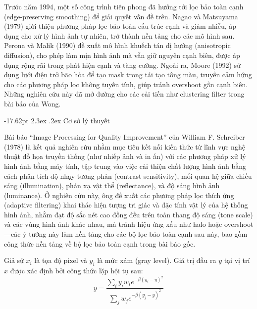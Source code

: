 \documentclass[a4paper]{report}
\makeatletter
\renewcommand\section{\@startsection{section}{1}{\z@}%
    {-17.62pt \@plus -5.89pt \@minus -1.18pt}%
    {2.3ex \@plus .2ex}%
    {\normalfont\fontsize{14.95pt}{16.31pt}\selectfont\bfseries}}%
\makeatother
\begin{document}
Trước năm 1994, một số công trình tiên phong đã hướng tới lọc bảo toàn cạnh
(edge-preserving smoothing) để giải quyết vấn đề trên. Nagao và Matsuyama\cite{nagao1979}
(1979) giới thiệu phương pháp lọc bảo toàn cấu trúc cạnh và giảm nhiễu, áp dụng
cho xử lý hình ảnh tự nhiên, trở thành nền tảng cho các mô hình sau. Perona và
Malik\cite{perona1990} (1990) đề xuất mô hình khuếch tán dị hướng (anisotropic diffusion), cho
phép làm mịn hình ảnh mà vẫn giữ nguyên cạnh biên, được áp dụng rộng rãi trong
phát hiện cạnh và tăng cường. Ngoài ra, Moore\cite{moore1992} (1992) sử dụng lưới điện trở bão
hòa để tạo mask trong tái tạo tông màu, truyền cảm hứng cho các phương pháp
lọc không tuyến tính, giúp tránh overshoot gần cạnh biên. Những nghiên cứu này
đã mở đường cho các cải tiến như clustering filter trong bài báo của Wong.

\section{Cơ sở lý thuyết}

Bài báo ``Image Processing for Quality Improvement''\cite{schreiber1978} của William F. Schreiber
(1978) là kết quả nghiên cứu nhằm mục tiêu kết nối kiến thức từ lĩnh vực nghệ
thuật đồ họa truyền thống (như nhiếp ảnh và in ấn) với các phương pháp xử lý hình
ảnh bằng máy tính, tập trung vào việc cải thiện chất lượng hình ảnh bằng cách
phân tích độ nhạy tương phản (contrast sensitivity), mối quan hệ giữa chiếu sáng
(illumination), phản xạ vật thể (reflectance), và độ sáng hình ảnh (luminance). Ở
nghiên cứu này, ông đề xuất các phương pháp lọc thích ứng (adaptive filtering)
khai thác hiện tượng tri giác và đặc tính vật lý của hệ thống hình ảnh, nhằm đạt
độ sắc nét cao đồng đều trên toàn thang độ sáng (tone scale) và các vùng hình
ảnh khác nhau, mà tránh hiệu ứng xấu như halo hoặc overshoot---các ý tưởng này
làm nền tảng cho các bộ lọc bảo toàn cạnh sau này, bao gồm công thức nền tảng
về bộ lọc bảo toàn cạnh trong bài báo gốc.

Giả sử $x_i$ là tọa độ pixel và $y_i$ là mức xám (gray level). Giá trị đầu ra $y$ tại vị trí $x$
được xác định bởi công thức lặp hội tụ sau:
{\setlength{\abovedisplayskip}{22.9pt plus 2.6pt minus 2.6pt}%
\setlength{\belowdisplayskip}{11.8pt plus 2.6pt minus 2.6pt}%
\begin{equation}
    y = \frac{\sum_i y_i w_i e^{-\beta(y_i-y)^2}}{\sum_j w_j e^{-\beta(y_j-y)^2}}
    \label{eq:clustering}
\end{equation}}
\end{document}
